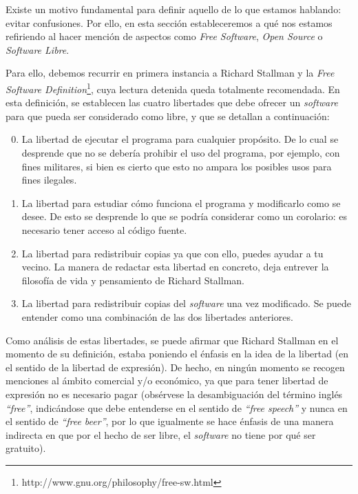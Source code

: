 Existe un motivo fundamental para definir aquello de lo que estamos hablando:
evitar confusiones. Por ello, en esta sección estableceremos a qué nos estamos
refiriendo al hacer mención de aspectos como \textit{Free Software},
\textit{Open Source} o \textit{Software Libre}.

Para ello, debemos recurrir en primera instancia a Richard Stallman y la
\textit{Free Software Definition}\footnote{
http://www.gnu.org/philosophy/free-sw.html }, cuya lectura detenida queda
totalmente recomendada. En esta definición, se establecen las cuatro libertades
que debe ofrecer un \textit{software} para que pueda ser considerado como libre,
y que se detallan a continuación:

\begin{enumerate}
  \setcounter{enumi}{-1}
  \item La libertad de ejecutar el programa para cualquier propósito. De lo
cual se desprende que no se debería prohibir el uso del programa, por ejemplo,
con fines militares, si bien es cierto que esto no ampara los posibles usos para
fines ilegales.
  \item La libertad para estudiar cómo funciona el programa y modificarlo como
se desee. De esto se desprende lo que se podría considerar como un corolario:
es necesario tener acceso al código fuente.
  \item La libertad para redistribuir copias ya que con ello, puedes ayudar a
tu vecino. La manera de redactar esta libertad en concreto, deja entrever la
filosofía de vida y pensamiento de Richard Stallman.
  \item La libertad para redistribuir copias del \textit{software} una vez
modificado. Se puede entender como una combinación de las dos libertades
anteriores.
\end{enumerate}

Como análisis de estas libertades, se puede afirmar que Richard Stallman en el
momento de su definición, estaba poniendo el énfasis en la idea de la libertad
(en el sentido de la libertad de expresión). De hecho, en ningún momento se
recogen menciones al ámbito comercial y/o económico, ya que para tener libertad
de expresión no es necesario pagar (obsérvese la desambiguación del término
inglés \textit{``free''}, indicándose que debe entenderse en el sentido de
\textit{``free speech''} y nunca en el sentido de \textit{``free beer''}, por lo
que igualmente se hace énfasis de una manera indirecta en que por el hecho de
ser libre, el \textit{software} no tiene por qué ser gratuito).

